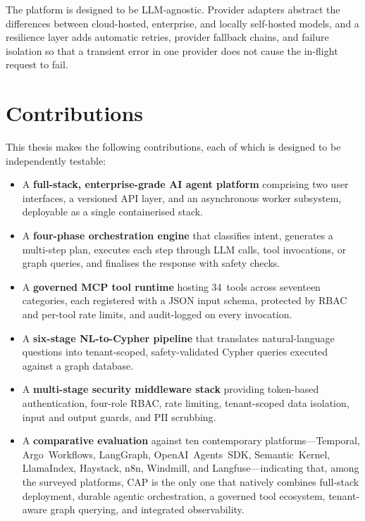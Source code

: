 \documentclass[a4paper]{sapthesis}
\begin{document}
The platform is designed to be LLM-agnostic.  Provider adapters abstract
the differences between cloud-hosted, enterprise, and locally self-hosted
models, and a resilience layer adds automatic retries, provider fallback
chains, and failure isolation so that a transient error in one provider
does not cause the in-flight request to fail.

\section{Contributions}
\label{sec:contributions}

This thesis makes the following contributions, each of which is designed to
be independently testable:

\begin{itemize}
    \item A \textbf{full-stack, enterprise-grade AI agent platform} comprising
          two user interfaces, a versioned API layer, and an asynchronous
          worker subsystem, deployable as a single containerised stack.

    \item A \textbf{four-phase orchestration engine} that classifies intent,
          generates a multi-step plan, executes each step through LLM
          calls, tool invocations, or graph queries, and finalises the
          response with safety checks.

    \item A \textbf{governed MCP tool runtime} hosting 34~tools across
          seventeen categories, each registered with a JSON input schema,
          protected by RBAC and per-tool rate limits, and audit-logged on
          every invocation.

    \item A \textbf{six-stage NL-to-Cypher pipeline} that translates
          natural-language questions into tenant-scoped, safety-validated
          Cypher queries executed against a graph database.

    \item A \textbf{multi-stage security middleware stack} providing
          token-based authentication, four-role RBAC, rate limiting,
          tenant-scoped data isolation, input and output guards, and PII
          scrubbing.

    \item A \textbf{comparative evaluation} against ten contemporary
          platforms---Temporal, Argo~Workflows, LangGraph,
          OpenAI~Agents~SDK, Semantic~Kernel, LlamaIndex, Haystack, n8n,
          Windmill, and Langfuse---indicating that, among the surveyed
          platforms, CAP is the only one that natively combines full-stack
          deployment, durable agentic orchestration, a governed tool
          ecosystem, tenant-aware graph querying, and integrated
          observability.
\end{itemize}
\end{document}
